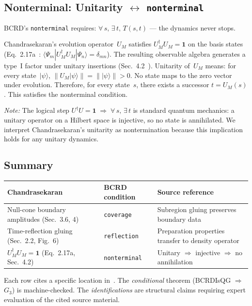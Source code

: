 \documentclass[11pt,a4paper]{article}
\theoremstyle{definition}
\theoremstyle{remark}
\begin{document}
\subsection{Nonterminal: Unitarity $\leftrightarrow$ \texttt{nonterminal}}

BCRD's \texttt{nonterminal} requires: $\forall\, s,\, \exists\, t,\, T(s,t)$ --- the dynamics never stops.

Chandrasekaran's evolution operator~$U_M$ satisfies $U_M^\dagger U_M = \mathbf{1}$ on the basis states (Eq.~2.17a~\cite{chandrasekaran2026}: $\langle\Psi_m | U_M^\dagger U_M | \Psi_n\rangle = \delta_{mn}$). The resulting observable algebra generates a type~I factor under unitary insertions (Sec.~4.2~\cite{chandrasekaran2026}). Unitarity of~$U_M$ means: for every state~$|\psi\rangle$, $\|U_M|\psi\rangle\| = \||\psi\rangle\| > 0$. No state maps to the zero vector under evolution. Therefore, for every state~$s$, there exists a successor $t = U_M(s)$. This satisfies the nonterminal condition.

\emph{Note:} The logical step $U^\dagger U = \mathbf{1} \;\Rightarrow\; \forall\, s,\, \exists\, t$ is standard quantum mechanics: a unitary operator on a Hilbert space is injective, so no state is annihilated. We interpret Chandrasekaran's unitarity as nontermination because this implication holds for any unitary dynamics.

\subsection{Summary}

\begin{center}
\begin{tabular}{p{4.2cm}p{3.5cm}p{5.5cm}}
\toprule
\textbf{Chandrasekaran} & \textbf{BCRD condition} & \textbf{Source reference} \\
\midrule
Null-cone boundary amplitudes (Sec.~3.6, 4) & \texttt{coverage} & Subregion gluing preserves boundary data \\
Time-reflection gluing (Sec.~2.2, Fig.~6) & \texttt{reflection} & Preparation properties transfer to density operator \\
$U_M^\dagger U_M = \mathbf{1}$ (Eq.~2.17a, Sec.~4.2) & \texttt{nonterminal} & Unitary $\Rightarrow$ injective $\Rightarrow$ no annihilation \\
\bottomrule
\end{tabular}
\end{center}

Each row cites a specific location in~\cite{chandrasekaran2026}. The \emph{conditional} theorem (BCRDIsQG $\Rightarrow$ $G_3$) is machine-checked. The \emph{identifications} are structural claims requiring expert evaluation of the cited source material.
\end{document}

